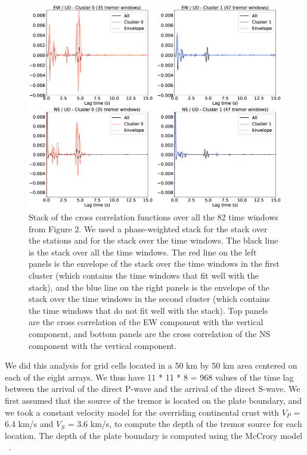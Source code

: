 \documentclass[draft]{agujournal2019}
\begin{document}
\begin{figure}
\noindent\includegraphics[width=\textwidth, trim={4.5cm 2.5cm 5cm 4cm},clip]{figures/BS_000_000_PWS_PWS_cluster_stackcc.eps}
\caption{Stack of the cross correlation functions over all the 82 time windows from Figure 2. We used a phase-weighted stack for the stack over the stations and for the stack over the time windows. The black line is the stack over all the time windows. The red line on the left panels is the envelope of the stack over the time windows in the first cluster (which contains the time windows that fit well with the stack), and the blue line on the right panels is the envelope of the stack over the time windows in the second cluster (which contains the time windows that do not fit well with the stack). Top panels are the cross correlation of the EW component with the vertical component, and bottom panels are the cross correlation of the NS component with the vertical component.}
\label{pngfiguresample}
\end{figure}

We did this analysis for grid cells located in a 50 km by 50 km area centered on each of the eight arrays. We thus have 11 * 11 * 8 = 968 values of the time lag between the arrival of the direct P-wave and the arrival of the direct S-wave. We first assumed that the source of the tremor is located on the plate boundary, and we took a constant velocity model for the overriding continental crust with $V_P$ = 6.4 km/s and $V_S$ = 3.6 km/s, to compute the depth of the tremor source for each location. The depth of the plate boundary is computed using the McCrory model ~\cite{MCC_2006}.
\end{document}

